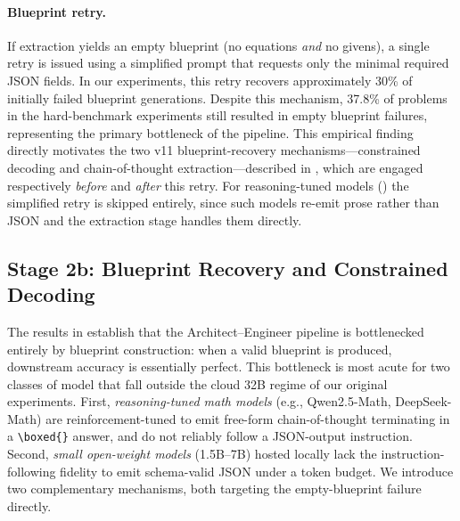 \documentclass[11pt,a4paper]{article}
\begin{document}
\paragraph{Blueprint retry.}
If extraction yields an empty blueprint (no equations \emph{and} no givens), a single retry is issued using a simplified prompt that requests only the minimal required JSON fields.
In our experiments, this retry recovers approximately 30\% of initially failed blueprint generations.
Despite this mechanism, 37.8\% of problems in the hard-benchmark experiments still resulted in empty blueprint failures, representing the primary bottleneck of the pipeline.
This empirical finding directly motivates the two v11 blueprint-recovery mechanisms---constrained decoding and chain-of-thought extraction---described in , which are engaged respectively \emph{before} and \emph{after} this retry. For reasoning-tuned models () the simplified retry is skipped entirely, since such models re-emit prose rather than JSON and the extraction stage handles them directly.
\subsection{Stage 2b: Blueprint Recovery and Constrained Decoding}
\label{sec:blueprint_recovery}
The results in  establish that the Architect--Engineer pipeline is bottlenecked entirely by blueprint construction: when a valid blueprint is produced, downstream accuracy is essentially perfect.
This bottleneck is most acute for two classes of model that fall outside the cloud 32B regime of our original experiments.
First, \emph{reasoning-tuned math models} (e.g., Qwen2.5-Math, DeepSeek-Math) are reinforcement-tuned to emit free-form chain-of-thought terminating in a \texttt{\textbackslash boxed\{\}} answer, and do not reliably follow a JSON-output instruction.
Second, \emph{small open-weight models} (1.5B--7B) hosted locally lack the instruction-following fidelity to emit schema-valid JSON under a token budget.
We introduce two complementary mechanisms, both targeting the empty-blueprint failure directly.
\end{document}
